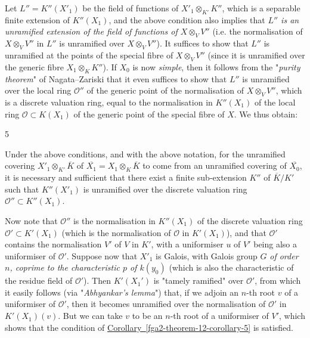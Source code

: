   Let \(L''=K''(X'_1)\) be the field of functions of \(X'_1\otimes _{K'}K''\), which is a separable finite extension of \(K''(X_1)\), and the above condition also implies that \emph{\(L''\) is an unramified extension of the field of functions of \(X\otimes _VV''\)} (i.e. the normalisation of \(X\otimes _V V''\) in \(L''\) is unramified over \(X\otimes _VV''\)).
  It suffices to show that \(L''\) is unramified at the points of the special fibre of \(X\otimes _VV''\) (since it is unramified over the generic fibre \(X_1\otimes _KK''\)).
  If \(X_0\) is now \emph{simple}, then it follows from the "\emph{purity theorem}" of Nagata–Zariski that it even suffices to show that \(L''\) is unramified over the local ring \(\mathcal {O}''\) of the generic point of the normalisation of \(X\otimes _VV''\), which is a discrete valuation ring, equal to the normalisation in \(K''(X_1)\) of the local ring \(\mathcal {O}\subset  K(X_1)\) of the generic point of the special fibre of \(X\).
  We thus obtain:\begin{corollary}{5}\label{fga2-theorem-12-corollary-5}\skipsinglepar\par{}Under the above conditions, and with the above notation, for the unramified covering \(X'_1\otimes _{K'}\overline {K}\) of \(\overline {X_1}=X_1\otimes _K\overline {K}\) to come from an unramified covering of \(\overline {X_0}\), it is necessary and sufficient that there exist a finite sub-extension \(K''\) of \(\overline {K}/K'\) such that \(K''(X'_1)\) is unramified over the discrete valuation ring \(\mathcal {O}''\subset  K''(X_1)\).\end{corollary}\par{}Now note that \(\mathcal {O}''\) is the normalisation in \(K''(X_1)\) of the discrete valuation ring \(\mathcal {O}'\subset  K'(X_1)\) (which is the normalisation of \(\mathcal {O}\) in \(K'(X_1)\)), and that \(\mathcal {O}'\) contains the normalisation \(V'\) of \(V\) in \(K'\), with a uniformiser \(u\) of \(V'\) being also a uniformiser of \(\mathcal {O}'\).
  Suppose now that \(X'_1\) is Galois, with Galois group \(G\) \emph{of order \(n\), coprime to the characteristic \(p\) of \(k(y_0)\)} (which is also the characteristic of the residue field of \(\mathcal {O}'\)).
  Then \(K'(X_1')\) is "tamely ramified" over \(\mathcal {O}'\), from which it easily follows (via "\emph{Abhyankar's lemma}") that, if we adjoin an \(n\)-th root \(v\) of a uniformiser of \(\mathcal {O}'\), then it becomes unramified over the normalisation of \(\mathcal {O}'\) in \(K'(X_1)(v)\).
  But we can take \(v\) to be an \(n\)-th root of a uniformiser of \(V'\), which shows that the condition of \hyperref[fga2-theorem-12-corollary-5]{Corollary~\ref*{fga2-theorem-12-corollary-5}} is satisfied.
